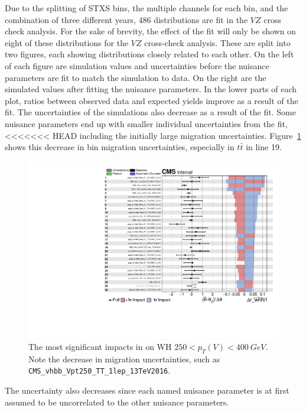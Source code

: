 Due to the splitting of STXS bins, the multiple channels for each bin, and the combination of three different years,
486 distributions are fit in the $V\!Z$ cross check
analysis.   
For the sake of brevity, the effect of the fit will only be shown on eight of these distributions for the $V\!Z$
cross-check analysis.
These are split into two figures, each showing distributions closely related to each other.
On the left of each figure are simulation values and uncertainties
before the nuisance parameters are fit to match the simulation to data.
On the right are the simulated values after fitting the nuisance parameters.
In the lower parts of each plot, ratios between observed data and expected yields improve as a result of the fit.
The uncertainties of the simulations also decrease as a result of the fit.
Some nuisance parameters end up with smaller individual uncertainties from the fit,
<<<<<<< HEAD
including the initially large migration uncertainties.
Figure~\ref{fig:impact-ex} shows this decrease in bin migration uncertainties,
especially in $t\bar{t}$ in line 19.
%
\begin{figure}
  \centering
  \includegraphics[width=0.85\linewidth,page=1]{figures/impacts/impacts_r_whhi1.pdf}
  \caption[Example impacts for WH $250 < p_T(V) < \SI{400}{GeV}$]{
    The most significant impacts in on WH $250 < p_T(V) < \SI{400}{GeV}$.
    Note the decrease in migration uncertainties, such as \texttt{CMS\_vhbb\_Vpt250\_TT\_1lep\_13TeV2016}.
  }
  \label{fig:impact-ex}
\end{figure}
%
The uncertainty also decreases since each named nuisance parameter is at first
assumed to be uncorrelated to the other nuisance parameters.

